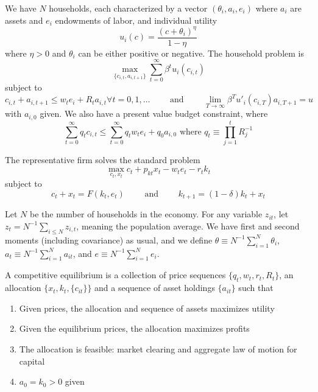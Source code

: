\documentclass[10pt]{article}
\begin{document}
\begin{model}
	 We have $N$ households, each characterized by a vector $(\theta_i,a_i,e_i)$ where $a_i$ are assets and $e_i$ endowments of labor, and individual utility \[u_i(c) = \frac{(c+\theta_i)^\eta}{1-\eta}\]where $\eta > 0$ and $\theta_i$ can be either positive or negative. The household problem is \[\max_{\{c_{i,t},a_{i,t+1}\}} \sum_{t=0}^\infty \beta^t u_i(c_{i,t})\]subject to \[c_{i,t} + a_{i,t+1} \le w_te_i + R_ta_{i,t} \forall t = 0,1,\dots \qquad \text{ and }\qquad \lim_{T\to\infty} \beta^T u'_i(c_{i,T})a_{i,T+1} = u\]with $a_{i,0}$ given. We also have a present value budget constraint, where \[\sum_{t=0}^\infty q_tc_{i,t} \le \sum_{t=0}^\infty q_tw_te_i + q_0a_{i,0} \text{ where } q_t \equiv \prod_{j=1}^t R_j^{-1}\]
	
	The representative firm solves the standard problem \[\max_{c_t,x_t} c_t + p_{kt} x_t - w_te_t - r_tk_t \]subject to \[c_t + x_t = F(k_t,e_t) \qquad \text{ and } \qquad k_{t+1} = (1-\delta)k_t + x_t\]
	
	Let $N$ be the number of households in the economy. For any variable $z_{it}$, let $z_t = N^{-1} \sum_{i\le N} z_{i,t}$, meaning the population average. We have first and second moments (including covariance) as usual, and we define $\theta \equiv N^{-1} \sum_{i=1}^N \theta_i$, $a_t \equiv N^{-1} \sum_{i=1}^N a_{it}$, and $e \equiv N^{-1} \sum_{i=1}^N e_{i}$.
	
	
	\begin{definition}
		A competitive equilibrium is a collection of price sequences $\{q_t,w_t,r_t,R_t\}$, an allocation $\{x_t,k_t,\{c_{it}\}\}$ and a sequence of asset holdings $\{a_{it}\}$ such that
		\begin{enumerate}
			\item Given prices, the allocation and sequence of assets maximizes utility
			\item Given the equilibrium prices, the allocation maximizes profits
			\item The allocation is feasible: market clearing and aggregate law of motion for capital
			\item $a_0 = k_0 > 0$ given
		\end{enumerate}
	\end{definition}
	

\end{model}
\end{document}
